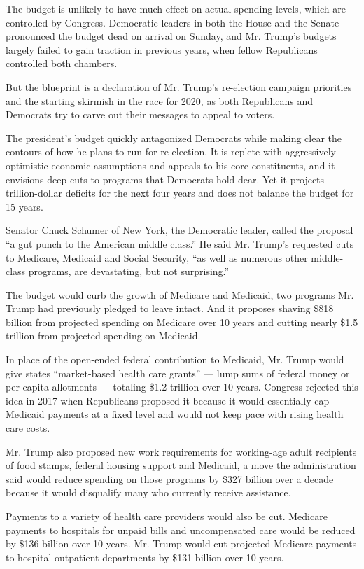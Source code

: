 The budget is unlikely to have much effect on actual spending levels,
which are controlled by Congress. Democratic leaders in both the House
and the Senate pronounced the budget dead on arrival on Sunday, and Mr.
Trump's budgets largely failed to gain traction in previous years, when
fellow Republicans controlled both chambers.

But the blueprint is a declaration of Mr. Trump's re-election campaign
priorities and the starting skirmish in the race for 2020, as both
Republicans and Democrats try to carve out their messages to appeal to
voters.

The president's budget quickly antagonized Democrats while making clear
the contours of how he plans to run for re-election. It is replete with
aggressively optimistic economic assumptions and appeals to his core
constituents, and it envisions deep cuts to programs that Democrats hold
dear. Yet it projects trillion-dollar deficits for the next four years
and does not balance the budget for 15 years.

Senator Chuck Schumer of New York, the Democratic leader, called the
proposal ``a gut punch to the American middle class.'' He said Mr.
Trump's requested cuts to Medicare, Medicaid and Social Security, ``as
well as numerous other middle-class programs, are devastating, but not
surprising.''

The budget would curb the growth of Medicare and Medicaid, two programs
Mr. Trump had previously pledged to leave intact. And it proposes
shaving \$818 billion from projected spending on Medicare over 10 years
and cutting nearly \$1.5 trillion from projected spending on Medicaid.

In place of the open-ended federal contribution to Medicaid, Mr. Trump
would give states ``market-based health care grants'' --- lump sums of
federal money or per capita allotments --- totaling \$1.2 trillion over
10 years. Congress rejected this idea in 2017 when Republicans proposed
it because it would essentially cap Medicaid payments at a fixed level
and would not keep pace with rising health care costs.

Mr. Trump also proposed new work requirements for working-age adult
recipients of food stamps, federal housing support and Medicaid, a move
the administration said would reduce spending on those programs by \$327
billion over a decade because it would disqualify many who currently
receive assistance.

Payments to a variety of health care providers would also be cut.
Medicare payments to hospitals for unpaid bills and uncompensated care
would be reduced by \$136 billion over 10 years. Mr. Trump would cut
projected Medicare payments to hospital outpatient departments by \$131
billion over 10 years.

